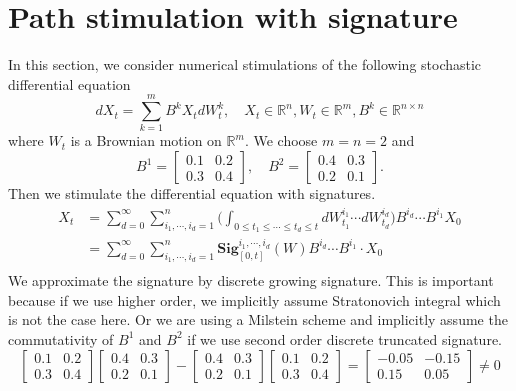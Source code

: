 \documentclass[12pt]{report}
\theoremstyle{definition}
\theoremstyle{remark}
\newcommand{\R}{\mathbb{R}}
\begin{document}
\section{Path stimulation with signature}
In this section, we consider numerical stimulations of the following stochastic differential equation
\begin{equation*}
  dX_t = \sum_{k=1}^{m} B^{k}X_{t}dW^{k}_{t},\quad X_{t}\in \mathbb{R}^{n}, W_{t}\in\mathbb{R}^{m}, B^{k} \in \mathbb{R}^{n\times n}
\end{equation*}
where $W_{t}$ is a Brownian motion on $\R^{m}$. We choose $m=n=2$ and 
\begin{equation*}
  B^{1} = \begin{bmatrix}
    0.1& 0.2\\
    0.3& 0.4
  \end{bmatrix},\quad 
  B^{2} = \begin{bmatrix}
    0.4& 0.3\\
    0.2& 0.1
  \end{bmatrix}.
\end{equation*}
Then we stimulate the differential equation with signatures.
\begin{equation*}
  \begin{split}
    X_t &= \sum_{d = 0}^{\infty}\sum_{i_{1},\cdots,i_{d} = 1}^{n} \bigg(\int_{0\leq t_{1}\leq\cdots\leq t_{d}\leq t}dW^{i_{1}}_{t_{1}}\cdots dW^{i_{d}}_{t_{d}}\bigg)B^{i_{d}}\cdots B^{i_{1}} X_{0}\\
    &= \sum_{d = 0}^{\infty}\sum_{i_{1},\cdots,i_{d} = 1}^{n} \mathbf{Sig}^{i_{1},\cdots,i_{d}}_{[0,t]}(W) B^{i_{d}}\cdots B^{i_{1}} \cdot X_{0}\\
  \end{split}
\end{equation*}
We approximate the signature by discrete growing signature. This is important because if we use higher order, we implicitly assume Stratonovich integral which is not the case here. Or we are using a Milstein scheme and implicitly assume the commutativity of $B^{1}$ and $B^{2}$ if we use second order discrete truncated signature.
\begin{equation*}
  \begin{bmatrix}
    0.1& 0.2\\
    0.3& 0.4
  \end{bmatrix}
  \begin{bmatrix}
    0.4& 0.3\\
    0.2& 0.1
  \end{bmatrix} 
  - 
  \begin{bmatrix}
    0.4& 0.3\\
    0.2& 0.1
  \end{bmatrix}
  \begin{bmatrix}
    0.1& 0.2\\
    0.3& 0.4
  \end{bmatrix}
  = 
  \begin{bmatrix}
    -0.05& -0.15\\
    0.15& 0.05
  \end{bmatrix} \neq 0
\end{equation*} 
\end{document}
